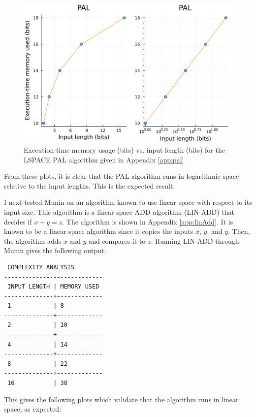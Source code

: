 \documentclass[11pt, a4paper]{article}
\begin{document}
\begin{figure}[H]
    \centering
    \includegraphics[width=\columnwidth]{PAL.png}
    \caption{Execution-time memory usage (bits) vs. input length (bits) for the LSPACE PAL algorithm given in Appendix \ref{app:pal}}
    \label{fig:pal}
\end{figure}

From these plots, it is clear that the PAL algorithm runs in logarithmic space relative to the input lengths.
This is the expected result.

I next tested Munin on an algorithm known to use linear space with respect to its input size.
This algorithm is a linear space ADD algorithm (LIN-ADD) that decides if \(x+y=z\).
The algorithm is shown in Appendix \ref{app:linAdd}.
It is known to be a linear space algorithm since it copies the inputs \(x\), \(y\), and \(y\).
Then, the algorithm adds \(x\) and \(y\) and compares it to \(z\).
Running LIN-ADD through Munin gives the following output:

\begin{lstlisting}
 COMPLEXITY ANALYSIS
----------------------------
 INPUT LENGTH | MEMORY USED 
--------------+-------------
 1            | 8      
--------------+-------------
 2            | 10      
--------------+-------------
 4            | 14      
--------------+-------------
 8            | 22      
--------------+-------------
 16           | 38      
\end{lstlisting}

This gives the following plots which validate that the algorithm runs in linear space, as expected:
\end{document}
